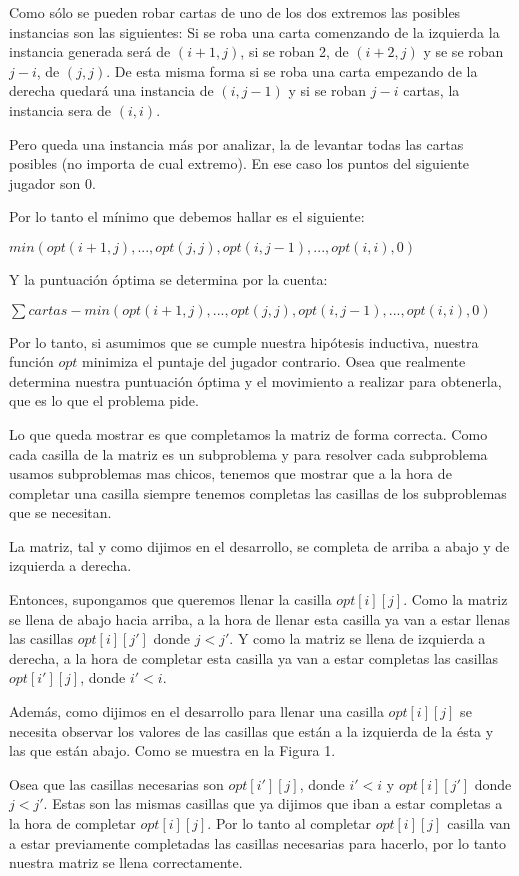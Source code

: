 Como sólo se pueden robar cartas de uno de los dos extremos las posibles instancias son las siguientes: Si se roba una carta comenzando de la izquierda la instancia generada será de $(i+1,j)$, si se roban 2, de $(i+2,j)$ y se se roban $j-i$, de $(j,j)$. De esta misma forma si se roba una carta empezando de la derecha quedará una instancia de $(i,j-1)$ y si se roban $j-i$ cartas, la instancia sera de $(i,i)$.

Pero queda una instancia más por analizar, la de levantar todas las cartas posibles (no importa de cual extremo). En ese caso los puntos del siguiente jugador son 0.

Por lo tanto el mínimo que debemos hallar es el siguiente:

$min(opt(i+1,j), ... , opt(j,j), opt(i,j-1), ... , opt(i,i), 0)$

Y la puntuación óptima se determina por la cuenta:

$\sum cartas - min(opt(i+1,j), ... , opt(j,j), opt(i,j-1), ... , opt(i,i), 0)$

Por lo tanto, si asumimos que se cumple nuestra hipótesis inductiva, nuestra función $opt$ minimiza el puntaje del jugador contrario. Osea que realmente determina nuestra puntuación óptima y el movimiento a realizar para obtenerla, que es lo que el problema pide.

Lo que queda mostrar es que completamos la matriz de forma correcta. Como cada casilla de la matriz es un subproblema y para resolver cada subproblema usamos subproblemas mas chicos, tenemos que mostrar que a la hora de completar una casilla siempre tenemos completas las casillas de los subproblemas que se necesitan.

La matriz, tal y como dijimos en el desarrollo, se completa de arriba a abajo y de izquierda a derecha.

Entonces, supongamos que queremos llenar la casilla $opt[i][j]$. Como la matriz se llena de abajo hacia arriba, a la hora de llenar esta casilla ya van a estar llenas las casillas $opt[i][j']$ donde $j < j'$. Y como la matriz se llena de izquierda a derecha, a la hora de completar esta casilla ya van a estar completas las casillas $opt[i'][j]$, donde $i' < i$.

Además, como dijimos en el desarrollo para llenar una casilla $opt[i][j]$ se necesita observar los valores de las casillas que están a la izquierda de la ésta y las que están abajo. Como se muestra en la Figura 1.

Osea que las casillas necesarias son $opt[i'][j]$, donde $i' < i$ y $opt[i][j']$ donde $j < j'$. Estas son las mismas casillas que ya dijimos que iban a estar completas a la hora de completar $opt[i][j]$. Por lo tanto al completar $opt[i][j]$ casilla van a estar previamente completadas las casillas necesarias para hacerlo, por lo tanto nuestra matriz se llena correctamente.